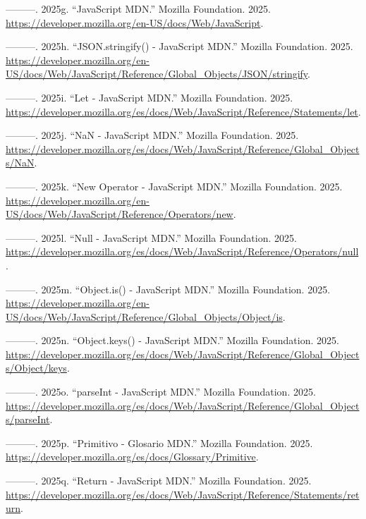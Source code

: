 \documentclass[
  letterpaper,
  DIV=11,
  numbers=noendperiod]{scrreprt}
\newlength{\cslhangindent}
\newenvironment{CSLReferences}[2] %
 {\begin{list}{}{%
  \setlength{\itemindent}{0pt}
  \setlength{\leftmargin}{0pt}
  \setlength{\parsep}{0pt}
  \ifodd #1
   \setlength{\leftmargin}{\cslhangindent}
   \setlength{\itemindent}{-1\cslhangindent}
  \fi
  \setlength{\itemsep}{#2\baselineskip}}}
 {\end{list}}
\begin{document}
\begin{CSLReferences}{1}{0}
---------. 2025g. {``JavaScript \textbar{} MDN.''} Mozilla Foundation.
2025. \url{https://developer.mozilla.org/en-US/docs/Web/JavaScript}.

---------. 2025h. {``JSON.stringify() - JavaScript \textbar{} MDN.''}
Mozilla Foundation. 2025.
\url{https://developer.mozilla.org/en-US/docs/Web/JavaScript/Reference/Global_Objects/JSON/stringify}.

---------. 2025i. {``Let - JavaScript \textbar{} MDN.''} Mozilla
Foundation. 2025.
\url{https://developer.mozilla.org/es/docs/Web/JavaScript/Reference/Statements/let}.

---------. 2025j. {``NaN - JavaScript \textbar{} MDN.''} Mozilla
Foundation. 2025.
\url{https://developer.mozilla.org/es/docs/Web/JavaScript/Reference/Global_Objects/NaN}.

---------. 2025k. {``New Operator - JavaScript \textbar{} MDN.''}
Mozilla Foundation. 2025.
\url{https://developer.mozilla.org/en-US/docs/Web/JavaScript/Reference/Operators/new}.

---------. 2025l. {``Null - JavaScript \textbar{} MDN.''} Mozilla
Foundation. 2025.
\url{https://developer.mozilla.org/es/docs/Web/JavaScript/Reference/Operators/null}.

---------. 2025m. {``Object.is() - JavaScript \textbar{} MDN.''} Mozilla
Foundation. 2025.
\url{https://developer.mozilla.org/en-US/docs/Web/JavaScript/Reference/Global_Objects/Object/is}.

---------. 2025n. {``Object.keys() - JavaScript \textbar{} MDN.''}
Mozilla Foundation. 2025.
\url{https://developer.mozilla.org/es/docs/Web/JavaScript/Reference/Global_Objects/Object/keys}.

---------. 2025o. {``parseInt - JavaScript \textbar{} MDN.''} Mozilla
Foundation. 2025.
\url{https://developer.mozilla.org/es/docs/Web/JavaScript/Reference/Global_Objects/parseInt}.

---------. 2025p. {``Primitivo - Glosario \textbar{} MDN.''} Mozilla
Foundation. 2025.
\url{https://developer.mozilla.org/es/docs/Glossary/Primitive}.

---------. 2025q. {``Return - JavaScript \textbar{} MDN.''} Mozilla
Foundation. 2025.
\url{https://developer.mozilla.org/es/docs/Web/JavaScript/Reference/Statements/return}.


\end{CSLReferences}
\end{document}
